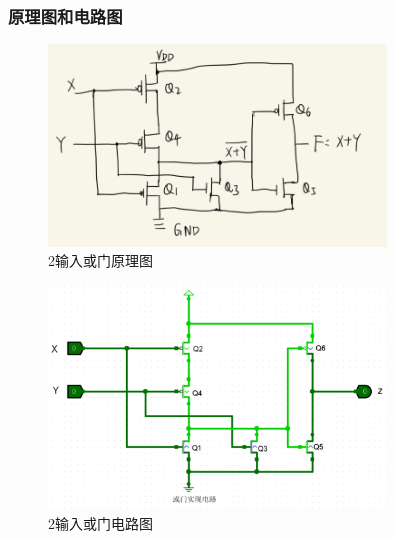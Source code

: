 \documentclass{article}
\begin{document}
    \subsubsection{原理图和电路图}
    \begin{figure}[H]
    \centering
    \includegraphics[width=0.8\textwidth]{2.4.png}
    \caption{2输入或门原理图}
    \end{figure}

    \begin{figure}[H]
    \centering
    \includegraphics[width=0.8\textwidth]{2.4.2.png}
    \caption{2输入或门电路图}
    \end{figure}
\end{document}
